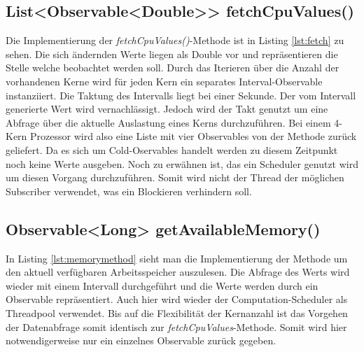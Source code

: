\subsection{List<Observable<Double>> fetchCpuValues()}
 
Die Implementierung der \textit{fetchCpuValues()}-Methode ist in Listing \ref{lst:fetch} zu sehen. Die sich ändernden Werte liegen als Double vor und repräsentieren die Stelle welche beobachtet werden soll. Durch das Iterieren über die Anzahl der vorhandenen Kerne wird für jeden Kern ein separates Interval-Observable instanziiert. Die Taktung des Intervalls liegt bei einer Sekunde. Der vom Intervall generierte Wert wird vernachlässigt. Jedoch wird der Takt genutzt um eine Abfrage über die aktuelle Auslastung eines Kerns durchzuführen. Bei einem 4-Kern Prozessor wird also eine Liste mit vier Observables von der Methode zurück geliefert. Da es sich um Cold-Oservables handelt werden zu diesem Zeitpunkt noch keine Werte ausgeben. Noch zu erwähnen ist, das ein Scheduler genutzt wird um diesen Vorgang durchzuführen. Somit wird nicht der Thread der möglichen Subscriber verwendet, was ein Blockieren verhindern soll. 
\subsection{Observable<Long> getAvailableMemory()}
 
In Listing \ref{lst:memorymethod} sieht man die Implementierung der Methode um den aktuell verfügbaren Arbeitsspeicher auszulesen. Die Abfrage des Werts wird wieder mit einem Intervall durchgeführt und die Werte werden durch ein Observable repräsentiert. Auch hier wird wieder der Computation-Scheduler als Threadpool verwendet. Bis auf die Flexibilität der Kernanzahl ist das Vorgehen der Datenabfrage somit identisch zur \textit{fetchCpuValues}-Methode. Somit wird hier notwendigerweise nur ein einzelnes Observable zurück gegeben.
